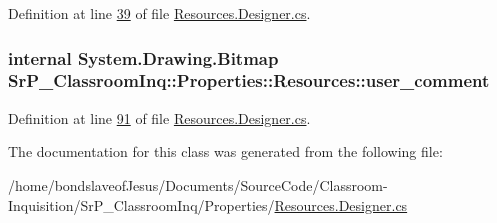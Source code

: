 \-Definition at line \hyperlink{_resources_8_designer_8cs_source_l00039}{39} of file \hyperlink{_resources_8_designer_8cs_source}{\-Resources.\-Designer.\-cs}.

\hypertarget{class_sr_p___classroom_inq_1_1_properties_1_1_resources_a640888878348ec44e2974837abb13f97}{
\subsubsection[{user\-\_\-comment}]{\setlength{\rightskip}{0pt plus 5cm}internal \-System.\-Drawing.\-Bitmap \-Sr\-P\-\_\-\-Classroom\-Inq\-::\-Properties\-::\-Resources\-::user\-\_\-comment}}
\label{class_sr_p___classroom_inq_1_1_properties_1_1_resources_a640888878348ec44e2974837abb13f97}


\-Definition at line \hyperlink{_resources_8_designer_8cs_source_l00091}{91} of file \hyperlink{_resources_8_designer_8cs_source}{\-Resources.\-Designer.\-cs}.



\-The documentation for this class was generated from the following file\-:\begin{DoxyCompactItemize}
\item 
/home/bondslaveof\-Jesus/\-Documents/\-Source\-Code/\-Classroom-\/\-Inquisition/\-Sr\-P\-\_\-\-Classroom\-Inq/\-Properties/\hyperlink{_resources_8_designer_8cs}{\-Resources.\-Designer.\-cs}\end{DoxyCompactItemize}
